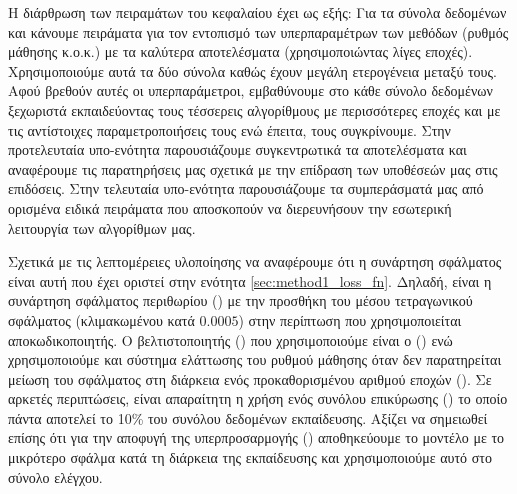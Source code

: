 Η διάρθρωση των πειραμάτων του κεφαλαίου έχει ως εξής: Για τα σύνολα δεδομένων  και  κάνουμε πειράματα για τον εντοπισμό των υπερπαραμέτρων των μεθόδων (ρυθμός μάθησης κ.ο.κ.) με τα καλύτερα αποτελέσματα (χρησιμοποιώντας λίγες εποχές). Χρησιμοποιούμε αυτά τα δύο σύνολα καθώς έχουν μεγάλη ετερογένεια μεταξύ τους. Αφού βρεθούν αυτές οι υπερπαράμετροι, εμβαθύνουμε στο κάθε σύνολο δεδομένων ξεχωριστά εκπαιδεύοντας τους τέσσερεις αλγορίθμους με περισσότερες εποχές και με τις αντίστοιχες παραμετροποιήσεις τους ενώ έπειτα, τους συγκρίνουμε. Στην προ\textendash τελευταία υπο-ενότητα παρουσιάζουμε συγκεντρωτικά τα αποτελέσματα και αναφέρουμε τις παρατηρήσεις μας σχετικά με την επίδραση των υποθέσεών μας στις επιδόσεις. Στην τελευταία υπο-ενότητα παρουσιάζουμε τα συμπεράσματά μας από ορισμένα ειδικά πειράματα που αποσκοπούν να διερευνήσουν την εσωτερική λειτουργία των αλγορίθμων μας.\par

Σχετικά με τις λεπτομέρειες υλοποίησης να αναφέρουμε ότι η συνάρτηση σφάλματος είναι αυτή που έχει οριστεί στην ενότητα \ref{sec:method1_loss_fn}. Δηλαδή, είναι η συνάρτηση σφάλματος περιθωρίου () με την προσθήκη του μέσου τετραγωνικού σφάλματος (κλιμακωμένου κατά $0.0005$) στην περίπτωση που χρησιμοποιείται αποκωδικοποιητής. Ο βελτιστοποιητής () που χρησιμοποιούμε είναι ο  () ενώ χρησιμοποιούμε και σύστημα ελάττωσης του ρυθμού μάθησης όταν δεν παρατηρείται μείωση του σφάλματος στη διάρκεια ενός προκαθορισμένου αριθμού εποχών (). Σε αρκετές περιπτώσεις, είναι απαραίτητη η χρήση ενός συνόλου επικύρωσης () το οποίο πάντα αποτελεί το 10\% του συνόλου δεδομένων εκπαίδευσης. Αξίζει να σημειωθεί επίσης ότι για την αποφυγή της υπερπροσαρμογής () αποθηκεύουμε το μοντέλο με το μικρότερο σφάλμα κατά τη διάρκεια της εκπαίδευσης και χρησιμοποιούμε αυτό στο σύνολο ελέγχου.\par

